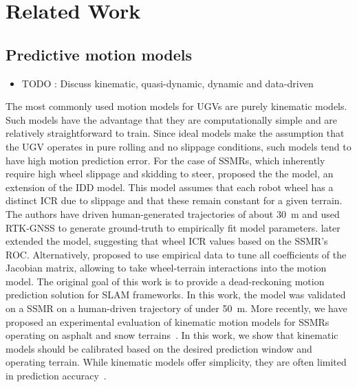 \section{Related Work}

\lightlipsum[1]

\subsection{Predictive motion models}

\begin{itemize}
	\item TODO : Discuss kinematic, quasi-dynamic, dynamic and data-driven
\end{itemize}

The most commonly used motion models for \acp{UGV} are purely kinematic models.
Such models have the advantage that they are computationally simple and are relatively straightforward to train.
Since ideal models make the assumption that the \ac{UGV} operates in pure rolling and no slippage conditions, such models tend to have high motion prediction error.
For the case of \acp{SSMR}, which inherently require high wheel slippage and skidding to steer, \citet{Mandow2007} proposed the the \ICRBASED model, an extension of the \ac{IDD} model.
This model assumes that each robot wheel has a distinct \ac{ICR} due to slippage and that these remain constant for a given terrain. 
The authors have driven human-generated trajectories of about \SI{30}{\meter} and used \ac{RTK}-\ac{GNSS} to generate ground-truth to empirically fit model parameters.
\citet{Wang2015} later extended the \ICRBASED model, suggesting that wheel \ac{ICR} values based on the \ac{SSMR}'s \ac{ROC}. 
Alternatively, \citet{Anousaki2004} proposed to use empirical data to tune all coefficients of the Jacobian matrix, allowing to take wheel-terrain interactions into the motion model.
The original goal of this work is to provide a dead-reckoning motion prediction solution for \ac{SLAM} frameworks. 
In this work, the model was validated on a \ac{SSMR} on a human-driven trajectory of under \SI{50}{\meter}.
More recently, we have proposed an experimental evaluation of kinematic motion models for \acp{SSMR} operating on asphalt and snow terrains~\citep{Baril2020}. 
In this work, we show that kinematic models should be calibrated based on the desired prediction window and operating terrain. 
While kinematic models offer simplicity, they are often limited in prediction accuracy~\citep{Seegmiller2016}. 

